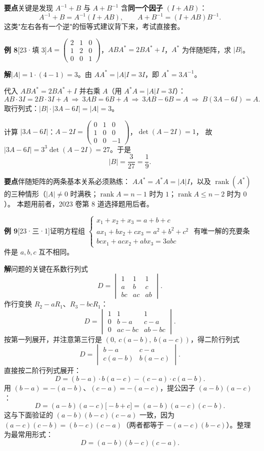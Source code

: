 \documentclass[10pt]{ctexart}
\newcommand{\rank}{\operatorname{rank}}
\newcommand{\bv}[1]{\begin{pmatrix}#1\end{pmatrix}}
\newcommand{\yiii}[1]{\textcolor{y23}{[23·#1]}}
\begin{document}
\begin{tipbox}
\textbf{要点}\quad 关键是发现 $A^{-1}+B$ 与 $A+B^{-1}$ 含\textbf{同一个因子} $(I+AB)$：
\[
A^{-1}+B=A^{-1}(I+AB),\qquad A+B^{-1}=(I+AB)B^{-1}.
\]
这类"左右各有一个逆"的恒等式建议背下来，考试直接套。
\end{tipbox}

\medskip
\textbf{例 8}\yiii{填 3}\quad $A=\bv{2&1&0\\1&2&0\\0&0&1}$，$ABA^{*}=2BA^{*}+I$，$A^{*}$ 为伴随矩阵，求 $|B|$。

\textbf{解}\quad $|A|=1\cdot(4-1)=3$。由 $AA^{*}=|A|I=3I$，即 $A^{*}=3A^{-1}$。

代入 $ABA^{*}=2BA^{*}+I$ 并右乘 $A$（用 $A^{*}A=|A|I=3I$）：
\[
AB\cdot3I=2B\cdot3I+A\ \Longrightarrow\ 3AB=6B+A\ \Longrightarrow\ 3AB-6B=A\ \Longrightarrow\ B(3A-6I)=A .
\]
取行列式：$|B|\cdot|3A-6I|=|A|=3$。

计算 $|3A-6I|$：$A-2I=\bv{0&1&0\\1&0&0\\0&0&-1}$，$\det(A-2I)=1$，
故 $|3A-6I|=3^3\det(A-2I)=27$。于是
\[
|B|=\frac{3}{27}=\frac19 .
\]

\begin{tipbox}
\textbf{要点}\quad 伴随矩阵的两条基本关系必须熟练：
$AA^{*}=A^{*}A=|A|I$，以及 $\rank(A^{*})$ 的三种情形（$|A|\neq0$ 时满秩；$\rank A=n-1$ 时为 $1$；$\rank A\le n-2$ 时为 $0$）。
本题用前者，2023 卷第 8 道选择题用后者。
\end{tipbox}

\medskip
\textbf{例 9}\yiii{三·1}\quad 证明方程组
$\begin{cases}x_1+x_2+x_3=a+b+c\\ ax_1+bx_2+cx_3=a^2+b^2+c^2\\ bcx_1+acx_2+abx_3=3abc\end{cases}$
有唯一解的充要条件是 $a,b,c$ 互不相同。

\textbf{解}\quad 问题的关键在系数行列式
\[
D=\begin{vmatrix}1&1&1\\a&b&c\\bc&ac&ab\end{vmatrix}.
\]
作行变换 $R_2-aR_1$、$R_3-bcR_1$：
\[
D=\begin{vmatrix}1&1&1\\0&b-a&c-a\\0&ac-bc&ab-bc\end{vmatrix}.
\]
按第一列展开，并注意第三行是 $(0,\ c(a-b),\ b(a-c))$，得二阶行列式
\[
D=\begin{vmatrix}b-a&c-a\\c(a-b)&b(a-c)\end{vmatrix}.
\]
直接按二阶行列式展开：
\[
D=(b-a)\cdot b(a-c)-(c-a)\cdot c(a-b).
\]
用 $(b-a)=-(a-b)$、$(c-a)=-(a-c)$，提公因子 $(a-b)(a-c)$：
\[
D=(a-b)(a-c)\big[-b+c\big]=(a-b)(a-c)(c-b).
\]
这与下面验证的 $(a-b)(b-c)(c-a)$ 一致，因为 $(a-c)(c-b)=(b-c)(c-a)$（两者都等于 $-(a-c)(b-c)$）。整理为最常用形式：
\[
D=(a-b)(b-c)(c-a).
\]
\end{document}
